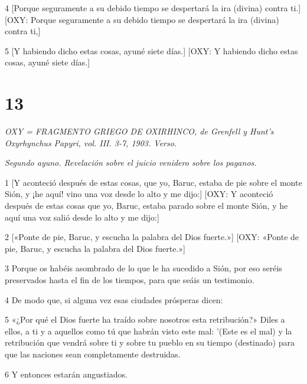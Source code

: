 \par 4 [Porque seguramente a su debido tiempo se despertará la ira (divina) contra ti.] [OXY: Porque seguramente a su debido tiempo se despertará la ira (divina) contra ti,]

\par [El cual ahora con gran paciencia está retenido como por riendas.] [OXY: Que ahora está retenido por gran paciencia como por riendas.]

\par 5 [Y habiendo dicho estas cosas, ayuné siete días.] [OXY: Y habiendo dicho estas cosas, ayuné siete días.]


\chapter{13}

\par \textit{OXY = FRAGMENTO GRIEGO DE OXIRHINCO, de Grenfell y Hunt's Oxyrhynchus Papyri, vol. III. 3-7, 1903. Verso.}

\par \textit{Segundo ayuno. Revelación sobre el juicio venidero sobre los paganos.}

\par 1 [Y aconteció después de estas cosas, que yo, Baruc, estaba de pie sobre el monte Sión, y ¡he aquí! vino una voz desde lo alto y me dijo:] [OXY: Y aconteció después de estas cosas que yo, Baruc, estaba parado sobre el monte Sión, y he aquí una voz salió desde lo alto y me dijo:]

\par 2 [«Ponte de pie, Baruc, y escucha la palabra del Dios fuerte.»] [OXY: «Ponte de pie, Baruc, y escucha la palabra del Dios fuerte.»]

\par 3 Porque os habéis asombrado de lo que le ha sucedido a Sión, por eso seréis preservados hasta el fin de los tiempos, para que seáis un testimonio.

\par 4 De modo que, si alguna vez esas ciudades prósperas dicen:

\par 5 «¿Por qué el Dios fuerte ha traído sobre nosotros esta retribución?» Diles a ellos, a ti y a aquellos como tú que habrán visto este mal: '(Este es el mal) y la retribución que vendrá sobre ti y sobre tu pueblo en su tiempo (destinado) para que las naciones sean completamente destruidas.

\par 6 Y entonces estarán angustiados.

